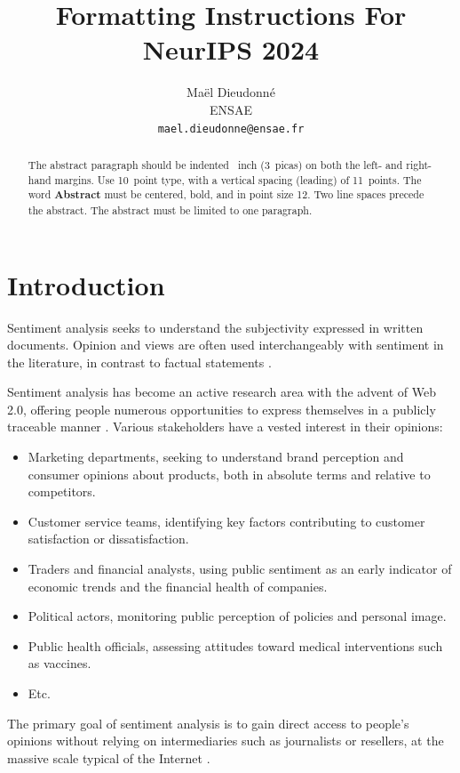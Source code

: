 \documentclass{article}
\title{Formatting Instructions For NeurIPS 2024}
\author{
  Maël Dieudonné\\
  ENSAE\\
  \texttt{mael.dieudonne@ensae.fr} \\
}
\begin{document}
\maketitle

\begin{abstract}
  The abstract paragraph should be indented ~inch (3~picas) on
  both the left- and right-hand margins. Use 10~point type, with a vertical
  spacing (leading) of 11~points. The word \textbf{Abstract} must be centered,
  bold, and in point size 12. Two line spaces precede the abstract. The abstract
  must be limited to one paragraph.
\end{abstract}


\section{Introduction}

Sentiment analysis seeks to understand the subjectivity expressed in written documents. Opinion and views are often used interchangeably with sentiment in the literature, in contrast to factual statements \citep{munezero_are_2014}.

Sentiment analysis has become an active research area with the advent of Web 2.0, offering people numerous opportunities to express themselves in a publicly traceable manner \citep{stine_sentiment_2019}. Various stakeholders have a vested interest in their opinions:
\begin{itemize}
\item Marketing departments, seeking to understand brand perception and consumer opinions about products, both in absolute terms and relative to competitors.
\item Customer service teams, identifying key factors contributing to customer satisfaction or dissatisfaction.
\item Traders and financial analysts, using public sentiment as an early indicator of economic trends and the financial health of companies.
\item Political actors, monitoring public perception of policies and personal image.
\item Public health officials, assessing attitudes toward medical interventions such as vaccines.
\item Etc.
\end{itemize}

The primary goal of sentiment analysis is to gain direct access to people's opinions without relying on intermediaries such as journalists or resellers, at the massive scale typical of the Internet \citep{ravi_survey_2015,hemmatian_survey_2019}.
\end{document}
